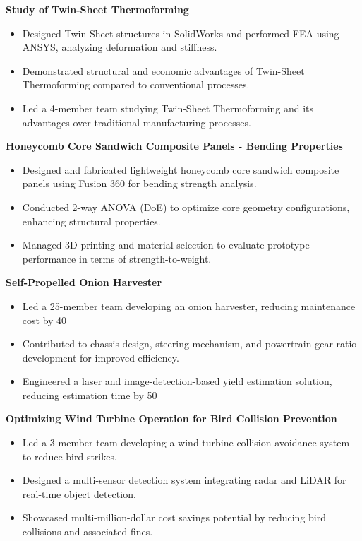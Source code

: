 \documentclass[a4paper,10pt]{article}
\begin{document}
\noindent \textbf{Study of Twin-Sheet Thermoforming}
\begin{itemize}[topsep=1pt]
  \item Designed Twin-Sheet structures in SolidWorks and performed FEA using ANSYS, analyzing deformation and stiffness.
  \item Demonstrated structural and economic advantages of Twin-Sheet Thermoforming compared to conventional processes.
  \item Led a 4-member team studying Twin-Sheet Thermoforming and its advantages over traditional manufacturing processes.
\end{itemize}
\vspace{2pt}
\noindent \textbf{Honeycomb Core Sandwich Composite Panels - Bending Properties}
\begin{itemize}[topsep=1pt]
  \item Designed and fabricated lightweight honeycomb core sandwich composite panels using Fusion 360 for bending strength analysis.
  \item Conducted 2-way ANOVA (DoE) to optimize core geometry configurations, enhancing structural properties.
  \item Managed 3D printing and material selection to evaluate prototype performance in terms of strength-to-weight.
\end{itemize}
\vspace{2pt}
\noindent \textbf{Self-Propelled Onion Harvester}
\begin{itemize}[topsep=1pt]
  \item Led a 25-member team developing an onion harvester, reducing maintenance cost by 40%
  \item Contributed to chassis design, steering mechanism, and powertrain gear ratio development for improved efficiency.
  \item Engineered a laser and image-detection-based yield estimation solution, reducing estimation time by 50%
\end{itemize}
\vspace{2pt}
\noindent \textbf{Optimizing Wind Turbine Operation for Bird Collision Prevention}
\begin{itemize}[topsep=1pt]
  \item Led a 3-member team developing a wind turbine collision avoidance system to reduce bird strikes.
  \item Designed a multi-sensor detection system integrating radar and LiDAR for real-time object detection.
  \item Showcased multi-million-dollar cost savings potential by reducing bird collisions and associated fines.
\end{itemize}
\end{document}
